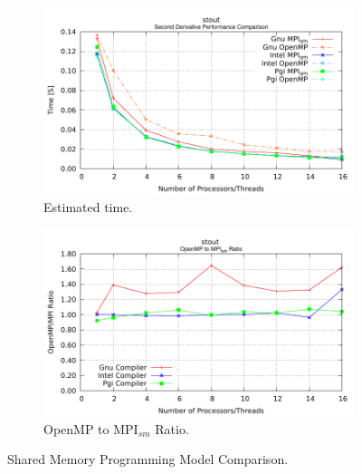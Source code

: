 \begin{figure} [t!]
    \centering
    \captionsetup{justification=centering, singlelinecheck=false}
    \begin{subfigure}{.6\textwidth}
      \centering
      \hspace*{-1.5cm} 
      \includegraphics[width=0.95\linewidth]{Plots/SMPM/stout.pdf}
      \caption[]{Estimated time.}
      \label{fig:sharedMemoryComparison2}
    \end{subfigure}%
    \begin{subfigure}{.6\textwidth}
      \centering
      \hspace*{-1.5cm} 
      \includegraphics[width=0.95\linewidth]{Plots/SMPM/stoutRatio.pdf}
      \caption{OpenMP to MPI$_{sm}$ Ratio.}
      \label{fig:sharedMemoryRatioComparison2}
    \end{subfigure}%
\caption{Shared Memory Programming Model Comparison.}
\label{fig:sharedMemoryProgrammingModel2}
\end{figure}



